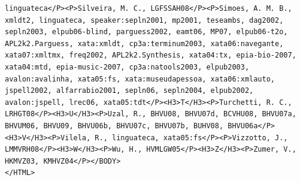 \documentclass[11pt,a4paper]{report}
\begin{document}
\begin{appendices}
\begin{lstlisting}
linguateca</P><P>Silveira, M. C., LGFSSAH08</P><P>Simoes, A. M. B., xmldt2, linguateca, speaker:sepln2001, mp2001, teseambs, dag2002, sepln2003, elpub06-blind, parguess2002, eamt06, MP07, elpub06-t2o, APL2k2.Parguess, xata:xmldt, cp3a:terminum2003, xata06:navegante, xata07:xmltmx, freq2002, APL2k2.Synthesis, xata04:tx, epia-bio-2007, xata04:mtd, epia-music-2007, cp3a:natools2003, elpub2003, avalon:avalinha, xata05:fs, xata:museudapessoa, xata06:xmlauto, jspell2002, alfarrabio2001, sepln06, sepln2004, elpub2002, avalon:jspell, lrec06, xata05:tdt</P><H3>T</H3><P>Turchetti, R. C., LRHGT08</P><H3>U</H3><P>Uzal, R., BHVU08, BHVU07d, BCVHU08, BHVU07a, BHVUM06, BHVU09, BHVU06b, BHVU07c, BHVU07b, BUHV08, BHVU06a</P><H3>V</H3><P>Vilela, R., linguateca, xata05:fs</P><P>Vizzotto, J., LMMVRH08</P><H3>W</H3><P>Wu, H., HVMLGW05</P><H3>Z</H3><P>Zumer, V., HKMVZ03, KMHVZ04</P></BODY>
</HTML>
\end{lstlisting}
\end{appendices} 
\end{document}
